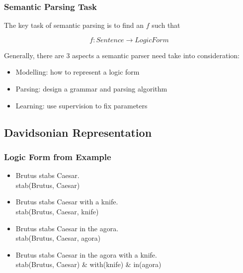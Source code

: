 \documentclass{beamer}
\begin{document}
\begin{frame}
    \frametitle{Semantic Parsing Task}

    The key task of semantic parsing is to find an $f$ such that

    \[
        f: Sentence \to LogicForm
    \]

    \pause

    Generally, there are 3 aspects a semantic parser need take into consideration:

    \begin{itemize}
        \item Modelling: how to represent a logic form
        \item Parsing: design a grammar and parsing algorithm
        \item Learning: use supervision to fix parameters
    \end{itemize}

\end{frame}


\subsection{Davidsonian Representation}

\begin{frame}
    \frametitle{Logic Form from Example}

    \begin{itemize}

        \item <2->
            Brutus stabs Caesar. \\
            stab(Brutus, Caesar) 

        \item <3->
            Brutus stabs Caesar with a knife. \\
            stab(Brutus, Caesar, \alert{knife}) 

        \item <4->
            Brutus stabs Caesar in the agora. \\
            stab(Brutus, Caesar, \alert{agora}) 

        \item <5->
            Brutus stabs Caesar in the agora with a knife. \\
            stab(Brutus, Caesar) \& \alert{with}(knife) \& \alert{in}(agora)

    \end{itemize}

\end{frame}
\end{document}
